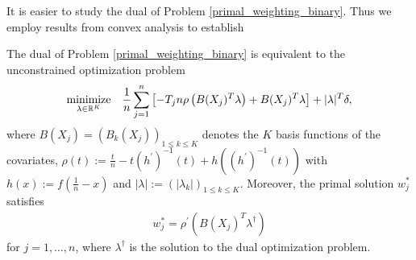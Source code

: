 It is easier to study the dual of 
Problem \eqref{primal_weighting_binary}.
Thus we employ results from convex analysis
\cite{Mordukhovich2022}
to establish
\begin{proposition}
  \label{ch_1_dual}
  The dual of Problem \eqref{primal_weighting_binary}
  is equivalent to the unconstrained optimization problem
  \begin{gather}
    \label{dual_weighting_binary}
    \underset{\lambda \in \mathbb{R}^K}{\text{minimize}}
    \quad
    \frac{1}{n}
    \sum_{j = 1}^{n} 
      \left[ 
        -T_j n 
        \rho 
        \left( 
          B(X_j)^T \lambda
        \right)
        +
        B(X_j)^T \lambda
      \right]
    +
    |\lambda|^T \delta,
  \end{gather}
  where 
  $
    B(X_j)=(B_k(X_j))_{1 \le k \le K}
  $
  denotes the $K$ basis functions of the covariates,
  $
    \rho(t) 
    :=
    \frac{t}{n}
    -
    t
    (h^{'})^{-1}(t)
    +
    h((h^{'})^{-1}(t))
  $
  with
  $
    h(x)
    :=
    f%
    \left( 
      \frac{1}{n}
      -
      x
    \right)
  $
  and
  $
    | \lambda | 
    :=
    \left(
    | \lambda_k | 
    \right)_{1 \le k \le K}
  $.
  Moreover,
  the primal solution
  $
    w^*_j
  $
  satisfies
  \begin{gather}
    \label{ch_1_w*}
    w^*_j
    =
    \rho^{'}
    \left(
      B(X_j)^T
      \lambda^\dagger
    \right)
  \end{gather}
  for 
  $
    j
    =
    1, \ldots , n
  $,
  where 
  $
    \lambda^\dagger
  $
  is the solution to the dual optimization problem.
\end{proposition}

